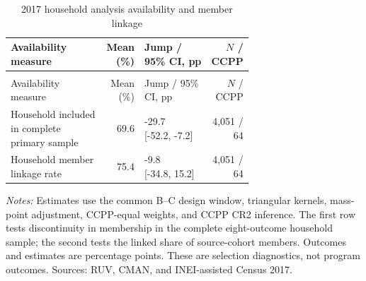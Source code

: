 \begingroup\fontsize{9.25}{11.4}\selectfont
\setlength{\tabcolsep}{3pt}\renewcommand{\arraystretch}{1.18}
\begin{longtable}{@{}>{\raggedright\arraybackslash}p{0.40\linewidth}rp{0.28\linewidth}r@{}}
\caption{2017 household analysis availability and member linkage}\label{tab:pub_M06} \\
\toprule Availability measure & Mean (\%) & Jump / 95\% CI, pp & \(N\) / CCPP \\ \midrule\endfirsthead
\multicolumn{4}{c}{\tablename\ \thetable{} -- continued} \\
\toprule Availability measure & Mean (\%) & Jump / 95\% CI, pp & \(N\) / CCPP \\ \midrule\endhead
Household included in complete primary sample & 69.6 & \shortstack[r]{-29.7 \\{} [-52.2, -7.2]} & 4,051 / 64 \\
Household member linkage rate & 75.4 & \shortstack[r]{-9.8 \\{} [-34.8, 15.2]} & 4,051 / 64 \\
\bottomrule\end{longtable}
\parbox{0.97\linewidth}{\footnotesize \textit{Notes:} Estimates use the common B--C design window, triangular kernels, mass-point adjustment, CCPP-equal weights, and CCPP CR2 inference. The first row tests discontinuity in membership in the complete eight-outcome household sample; the second tests the linked share of source-cohort members. Outcomes and estimates are percentage points. These are selection diagnostics, not program outcomes. Sources: RUV, CMAN, and INEI-assisted Census 2017.}
\par{}\par\endgroup
